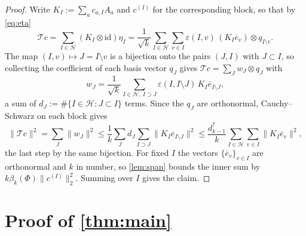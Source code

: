 \documentclass[11pt,reqno]{amsart}
\theoremstyle{plain}
\theoremstyle{remark}
\newcommand{\id}{\mathrm{id}}
\newcommand{\norm}[1]{\lVert #1\rVert}
\begin{document}
\begin{proof}
Write $K_I:=\sum_ac_{a,I}A_a$ and $c^{(I)}$ for the corresponding block, so that
by \cref{eq:eta}
\[
    \mathcal Tc
    =\sum_{I\in\mathcal H}(K_I\otimes\id)\eta_I
    =\frac1{\sqrt k}\sum_{I\in\mathcal H}\sum_{v\in I}
      \varepsilon(I,v)\,(K_I\overline e_v)\otimes q_{I\setminus v} .
\]
The map $(I,v)\mapsto J=I\setminus v$ is a bijection onto the pairs $(J,I)$ with
$J\subset I$, so collecting the coefficient of each basis vector $q_J$ gives
$\mathcal Tc=\sum_Jw_J\otimes q_J$ with
\[
    w_J=\frac1{\sqrt k}\sum_{I\in\mathcal H,\ I\supset J}
        \varepsilon(I,I\setminus J)\,K_I\overline e_{I\setminus J},
\]
a sum of $d_J:=\#\{I\in\mathcal H:J\subset I\}$ terms.  Since the $q_J$ are
orthonormal, Cauchy--Schwarz on each block gives
\[
    \norm{\mathcal Tc}^2=\sum_J\norm{w_J}^2
    \le\frac1k\sum_Jd_J\!\!\sum_{I\supset J}\!\!
       \norm{K_I\overline e_{I\setminus J}}^2
    \le\frac{d^\uparrow_{k-1}}k\sum_{I\in\mathcal H}\sum_{v\in I}
       \norm{K_I\overline e_v}^2 ,
\]
the last step by the same bijection.  For fixed $I$ the vectors
$\{\overline e_v\}_{v\in I}$ are orthonormal and $k$ in number, so
\cref{lem:span} bounds the inner sum by $k\beta_k(\Phi)\norm{c^{(I)}}_2^2$.
Summing over $I$ gives the claim.
\end{proof}

\section{Proof of \texorpdfstring{\cref{thm:main}}{the theorem}}
\end{document}
